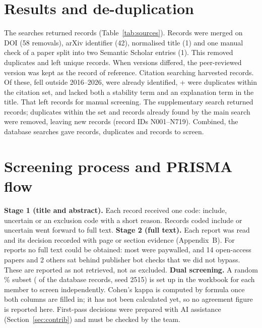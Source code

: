 \section{Results and de-duplication}
The searches returned \idTotal{} records (Table~\ref{tab:sources}). Records were merged on DOI (58 removals), arXiv identifier (42), normalised title (1) and one manual check of a paper split into two Semantic Scholar entries (1). This removed \dupRemoved{} duplicates and left \nUnique{} unique records. When versions differed, the peer-reviewed version was kept as the record of reference. Citation searching harvested \csHarvested{} records. Of these, \csYear{} fell outside 2016--2026, \csAlready{} were already identified, \the\numexpr\csDupWithin+\csDupManual\relax{} were duplicates within the citation set, and \csTitleFilter{} lacked both a stability term and an explanation term in the title. That left \csScreened{} records for manual screening. The supplementary search returned \spTotal{} records; \spDupWithin{} duplicates within the set and \spDupMain{} records already found by the main search were removed, leaving \spScreened{} new records (record IDs N001--N719). Combined, the database searches gave \dbAllId{} records, \dbAllDup{} duplicates and \dbAllScreened{} records to screen.

\section{Screening process and PRISMA flow}
\textbf{Stage 1 (title and abstract).} Each record received one code: include, uncertain or an exclusion code with a short reason. Records coded include or uncertain went forward to full text.
\textbf{Stage 2 (full text).} Each report was read and its decision recorded with page or section evidence (Appendix~B). For \totalNotRetrieved{} reports no full text could be obtained: most were paywalled, and 14 open-access papers and 2 others sat behind publisher bot checks that we did not bypass. These are reported as not retrieved, not as excluded.
\textbf{Dual screening.} A random \dualPct\% subset (\dualN{} of the \dualPool{} database records, seed 2515) is set up in the workbook for each member to screen independently. Cohen's kappa \cite{cohen1960} is computed by formula once both columns are filled in; it has not been calculated yet, so no agreement figure is reported here. First-pass decisions were prepared with AI assistance (Section~\ref{sec:contrib}) and must be checked by the team.

